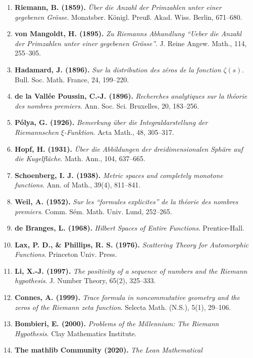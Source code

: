 \documentclass[
  11pt,
]{article}
\providecommand{\tightlist}{%
  \setlength{\itemsep}{0pt}\setlength{\parskip}{0pt}}
\begin{document}
\begin{enumerate}
\def\labelenumi{\arabic{enumi}.}
\tightlist
\item
  \textbf{Riemann, B. (1859).} \emph{Über die Anzahl der Primzahlen
  unter einer gegebenen Grösse}. Monatsber. Königl. Preuß. Akad. Wiss.
  Berlin, 671--680.
\item
  \textbf{von Mangoldt, H. (1895).} \emph{Zu Riemanns Abhandlung ``Ueber
  die Anzahl der Primzahlen unter einer gegebenen Grösse''}. J. Reine
  Angew. Math., 114, 255--305.
\item
  \textbf{Hadamard, J. (1896).} \emph{Sur la distribution des zéros de
  la fonction \(\zeta(s)\)}. Bull. Soc. Math. France, 24, 199--220.
\item
  \textbf{de la Vallée Poussin, C.-J. (1896).} \emph{Recherches
  analytiques sur la théorie des nombres premiers}. Ann. Soc. Sci.
  Bruxelles, 20, 183--256.
\item
  \textbf{Pólya, G. (1926).} \emph{Bemerkung über die
  Integraldarstellung der Riemannschen \(\xi\)-Funktion}. Acta Math.,
  48, 305--317.
\item
  \textbf{Hopf, H. (1931).} \emph{Über die Abbildungen der
  dreidimensionalen Sphäre auf die Kugelfläche}. Math. Ann., 104,
  637--665.
\item
  \textbf{Schoenberg, I. J. (1938).} \emph{Metric spaces and completely
  monotone functions}. Ann. of Math., 39(4), 811--841.
\item
  \textbf{Weil, A. (1952).} \emph{Sur les ``formules explicites'' de la
  théorie des nombres premiers}. Comm. Sém. Math. Univ. Lund, 252--265.
\item
  \textbf{de Branges, L. (1968).} \emph{Hilbert Spaces of Entire
  Functions}. Prentice-Hall.
\item
  \textbf{Lax, P. D., \& Phillips, R. S. (1976).} \emph{Scattering
  Theory for Automorphic Functions}. Princeton Univ. Press.
\item
  \textbf{Li, X.-J. (1997).} \emph{The positivity of a sequence of
  numbers and the Riemann hypothesis}. J. Number Theory, 65(2),
  325--333.
\item
  \textbf{Connes, A. (1999).} \emph{Trace formula in noncommutative
  geometry and the zeros of the Riemann zeta function}. Selecta Math.
  (N.S.), 5(1), 29--106.
\item
  \textbf{Bombieri, E. (2000).} \emph{Problems of the Millennium: The
  Riemann Hypothesis}. Clay Mathematics Institute.
\item
  \textbf{The mathlib Community (2020).} \emph{The Lean Mathematical
}
\end{enumerate}
\end{document}
